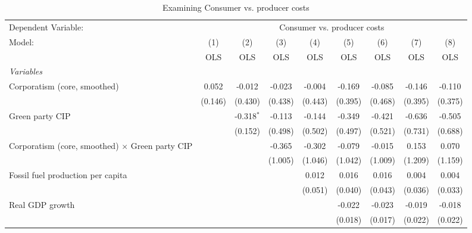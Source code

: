 
\begin{table}[htbp]
   \caption{Examining Consumer vs. producer costs}
   \centering
   \begin{tabular}{lcccccccc}
      \toprule
      Dependent Variable: & \multicolumn{8}{c}{Consumer vs. producer costs}\\
      Model:                                                 & (1)     & (2)          & (3)     & (4)     & (5)     & (6)     & (7)     & (8)\\  
                                                             &  OLS    & OLS          & OLS     & OLS     & OLS     & OLS     & OLS     & OLS\\  
      \midrule
      \emph{Variables}\\
      Corporatism (core, smoothed)                           & 0.052   & -0.012       & -0.023  & -0.004  & -0.169  & -0.085  & -0.146  & -0.110\\   
                                                             & (0.146) & (0.430)      & (0.438) & (0.443) & (0.395) & (0.468) & (0.395) & (0.375)\\   
      Green party CIP                                        &         & -0.318$^{*}$ & -0.113  & -0.144  & -0.349  & -0.421  & -0.636  & -0.505\\   
                                                             &         & (0.152)      & (0.498) & (0.502) & (0.497) & (0.521) & (0.731) & (0.688)\\   
      Corporatism (core, smoothed) $\times$ Green party CIP  &         &              & -0.365  & -0.302  & -0.079  & -0.015  & 0.153   & 0.070\\   
                                                             &         &              & (1.005) & (1.046) & (1.042) & (1.009) & (1.209) & (1.159)\\   
      Fossil fuel production per capita                      &         &              &         & 0.012   & 0.016   & 0.016   & 0.004   & 0.004\\   
                                                             &         &              &         & (0.051) & (0.040) & (0.043) & (0.036) & (0.033)\\   
      Real GDP growth                                        &         &              &         &         & -0.022  & -0.023  & -0.019  & -0.018\\   
                                                             &         &              &         &         & (0.018) & (0.017) & (0.022) & (0.022)\\   

\end{tabular}
\end{table}
